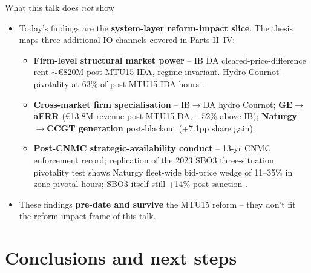 \documentclass[aspectratio=169,10pt]{beamer}
\begin{document}
\begin{frame}{What this talk does \emph{not} show}
\begin{itemize}
  \item Today's findings are the \textbf{system-layer reform-impact slice}. The thesis maps three additional IO channels covered in Parts II--IV:
  \begin{itemize}
    \item \textbf{Firm-level structural market power} -- IB DA cleared-price-difference rent $\sim$€820M post-MTU15-IDA, regime-invariant. Hydro Cournot-pivotality at 63\% of post-MTU15-IDA hours \citep{Bushnell2003,HortacsuPuller2008,CiarretaEspinosa2010}.
    \item \textbf{Cross-market firm specialisation} -- IB$\to$DA hydro Cournot; \textbf{GE$\to$aFRR} (€13.8M revenue post-MTU15-DA, +52\% above IB); \textbf{Naturgy$\to$CCGT generation} post-blackout (+7.1pp share gain).
    \item \textbf{Post-CNMC strategic-availability conduct} -- 13-yr CNMC enforcement record; replication of the 2023 SBO3 three-situation pivotality test shows Naturgy fleet-wide bid-price wedge of 11--35\% in zone-pivotal hours; SBO3 itself still +14\% post-sanction \citep{JoskowKahn2002}.
  \end{itemize}
  \item These findings \textbf{pre-date and survive} the MTU15 reform -- they don't fit the reform-impact frame of this talk.
\end{itemize}
\end{frame}


\section{Conclusions and next steps}
\end{document}
